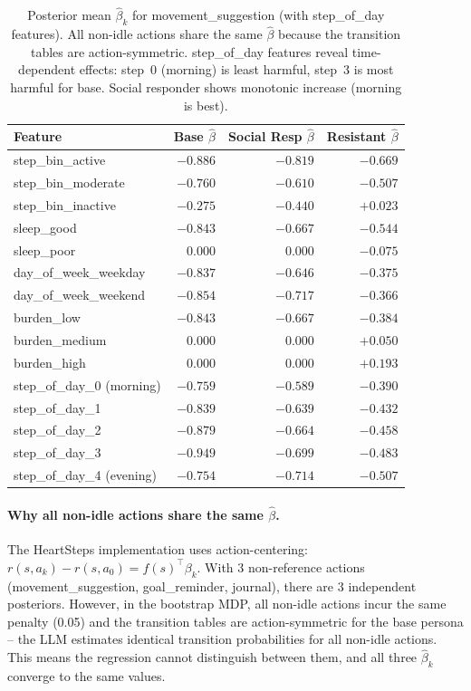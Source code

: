 \documentclass[11pt]{article}
\begin{document}
\begin{table}[h]
\centering
\small
\begin{tabular}{lrrr}
\toprule
Feature & Base $\hat{\beta}$ & Social Resp $\hat{\beta}$ & Resistant $\hat{\beta}$ \\
\midrule
step\_bin\_active & $-0.886$ & $-0.819$ & $-0.669$ \\
step\_bin\_moderate & $-0.760$ & $-0.610$ & $-0.507$ \\
step\_bin\_inactive & $-0.275$ & $-0.440$ & $+0.023$ \\
sleep\_good & $-0.843$ & $-0.667$ & $-0.544$ \\
sleep\_poor & $0.000$ & $0.000$ & $-0.075$ \\
day\_of\_week\_weekday & $-0.837$ & $-0.646$ & $-0.375$ \\
day\_of\_week\_weekend & $-0.854$ & $-0.717$ & $-0.366$ \\
burden\_low & $-0.843$ & $-0.667$ & $-0.384$ \\
burden\_medium & $0.000$ & $0.000$ & $+0.050$ \\
burden\_high & $0.000$ & $0.000$ & $+0.193$ \\
\midrule
step\_of\_day\_0 (morning) & $-0.759$ & $-0.589$ & $-0.390$ \\
step\_of\_day\_1 & $-0.839$ & $-0.639$ & $-0.432$ \\
step\_of\_day\_2 & $-0.879$ & $-0.664$ & $-0.458$ \\
step\_of\_day\_3 & $-0.949$ & $-0.699$ & $-0.483$ \\
step\_of\_day\_4 (evening) & $-0.754$ & $-0.714$ & $-0.507$ \\
\bottomrule
\end{tabular}
\caption{Posterior mean $\hat{\beta}_k$ for movement\_suggestion (with step\_of\_day features). All non-idle actions share the same $\hat{\beta}$ because the transition tables are action-symmetric. step\_of\_day features reveal time-dependent effects: step~0 (morning) is least harmful, step~3 is most harmful for base. Social responder shows monotonic increase (morning is best).}
\label{tab:hs_betas_tod}
\end{table}

\paragraph{Why all non-idle actions share the same $\hat{\beta}$.}
The HeartSteps implementation uses action-centering: $r(s, a_k) - r(s, a_0) = f(s)^\top \beta_k$. With 3 non-reference actions (movement\_suggestion, goal\_reminder, journal), there are 3 independent posteriors. However, in the bootstrap MDP, all non-idle actions incur the same penalty (0.05) and the transition tables are action-symmetric for the base persona -- the LLM estimates identical transition probabilities for all non-idle actions. This means the regression cannot distinguish between them, and all three $\hat{\beta}_k$ converge to the same values.
\end{document}
